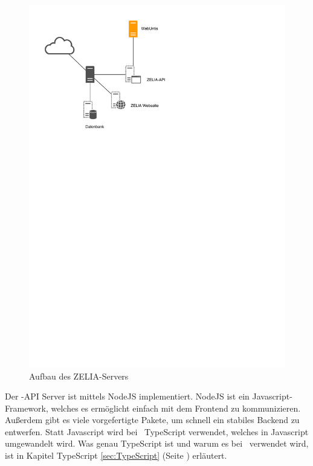 \begin{figure}[H]
    \centering
    \includegraphics[width=120mm]{./media/Intro/server_arch.svg.pdf}
    \caption{Aufbau des ZELIA-Servers}
    \label{fig:server_arch}
\end{figure}

Der \ZELIA-API Server ist mittels NodeJS implementiert. NodeJS ist ein Javascript-Framework, welches es ermöglicht einfach mit dem Frontend zu kommunizieren. Außerdem gibt es viele vorgefertigte Pakete, um schnell ein stabiles Backend zu entwerfen. Statt Javascript wird bei \ZELIA\  TypeScript verwendet, welches in Javascript umgewandelt wird. Was genau TypeScript ist und warum es bei \ZELIA\ verwendet wird, ist in Kapitel TypeScript \ref{sec:TypeScript} (Seite \pageref{sec:TypeScript}) erläutert.


